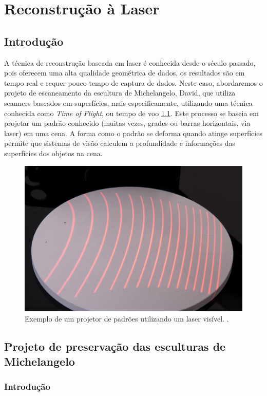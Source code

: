 \chapter{Reconstrução à Laser}\label{cap:laser}

\section*{Introdução}

A técnica de reconstrução baseada em laser é conhecida desde o século passado, pois oferecem uma alta qualidade geométrica de dados, os resultados são em tempo real e requer pouco tempo de captura de dados. 
Neste caso, abordaremos o projeto de escaneamento da escultura de Michelangelo, David, que utiliza scanners baseados em superfícies, mais especificamente, utilizando uma técnica conhecida como \emph{Time of Flight}, ou tempo de voo \ref{fig:luzestruturada}. Este processo se baseia em projetar um padrão conhecido (muitas vezes, grades ou barras horizontais, via laser) em uma cena. A forma como o padrão se deforma quando atinge superfícies permite que sistemas de visão calculem a profundidade e informações das superfícies dos objetos na cena.

\begin{figure}[!h]
	\centering
	\includegraphics[width=0.7\linewidth]{figs/luzestruturada.jpg}
	\caption{%
	Exemplo de um projetor de padrões utilizando um laser visível.
	\cite{luzEstruturada}.
	}\label{fig:luzestruturada}
\end{figure}

\section{Projeto de preservação das esculturas de Michelangelo}\label{sec:David}

\subsection*{Introdução}

